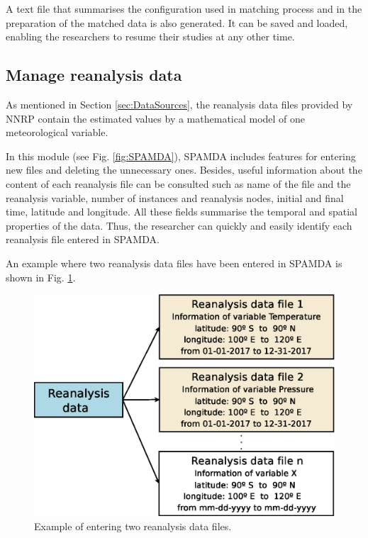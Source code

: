 \documentclass[review]{elsarticle}
\begin{document}
				A text file that summarises the configuration used in matching process and in the preparation of the matched data is also generated. It can be saved and loaded, enabling the researchers to resume their studies at any other time.
				
				
			\subsection{Manage reanalysis data}
				
				As mentioned in Section \ref{sec:DataSources}, the reanalysis data files provided by NNRP contain the estimated values by a mathematical model of one meteorological variable.
				
				In this module (see Fig. \ref{fig:SPAMDA}), SPAMDA includes features for entering new files and deleting the unnecessary ones. Besides, useful information about the content of each reanalysis file can be consulted such as name of the file and the reanalysis variable, number of instances and reanalysis nodes, initial and final time, latitude and longitude. All these fields summarise the temporal and spatial properties of the data. Thus, the researcher can quickly and easily identify each reanalysis file entered in SPAMDA.
				
				An example where two reanalysis data files have been entered in SPAMDA is shown in Fig. \ref{fig:manageReanalisys}.
				
				\begin{figure}[ht!]
					\centering
					\includegraphics[scale=0.45]{figures/FigureManageReanalisys.eps}
					\caption{Example of entering two reanalysis data files.}
					\label{fig:manageReanalisys}
				\end{figure}
				
\end{document}
